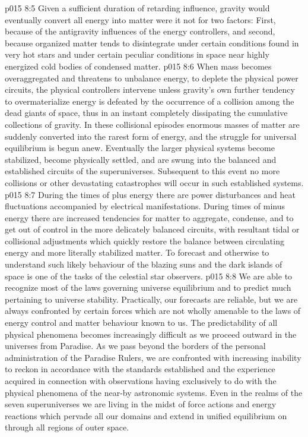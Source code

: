 \vs p015 8:5 Given a sufficient duration of retarding influence, gravity would eventually convert all energy into matter were it not for two factors: First, because of the antigravity influences of the energy controllers, and second, because organized matter tends to disintegrate under certain conditions found in very hot stars and under certain peculiar conditions in space near highly energized cold bodies of condensed matter.
\vs p015 8:6 When mass becomes overaggregated and threatens to unbalance energy, to deplete the physical power circuits, the physical controllers intervene unless gravity’s own further tendency to overmaterialize energy is defeated by the occurrence of a collision among the dead giants of space, thus in an instant completely dissipating the cumulative collections of gravity. In these collisional episodes enormous masses of matter are suddenly converted into the rarest form of energy, and the struggle for universal equilibrium is begun anew. Eventually the larger physical systems become stabilized, become physically settled, and are swung into the balanced and established circuits of the superuniverses. Subsequent to this event no more collisions or other devastating catastrophes will occur in such established systems.
\vs p015 8:7 During the times of plus energy there are power disturbances and heat fluctuations accompanied by electrical manifestations. During times of minus energy there are increased tendencies for matter to aggregate, condense, and to get out of control in the more delicately balanced circuits, with resultant tidal or collisional adjustments which quickly restore the balance between circulating energy and more literally stabilized matter. To forecast and otherwise to understand such likely behaviour of the blazing suns and the dark islands of space is one of the tasks of the celestial star observers.
\vs p015 8:8 We are able to recognize most of the laws governing universe equilibrium and to predict much pertaining to universe stability. Practically, our forecasts are reliable, but we are always confronted by certain forces which are not wholly amenable to the laws of energy control and matter behaviour known to us. The predictability of all physical phenomena becomes increasingly difficult as we proceed outward in the universes from Paradise. As we pass beyond the borders of the personal administration of the Paradise Rulers, we are confronted with increasing inability to reckon in accordance with the standards established and the experience acquired in connection with observations having exclusively to do with the physical phenomena of the near-by astronomic systems. Even in the realms of the seven superuniverses we are living in the midst of force actions and energy reactions which pervade all our domains and extend in unified equilibrium on through all regions of outer space.
